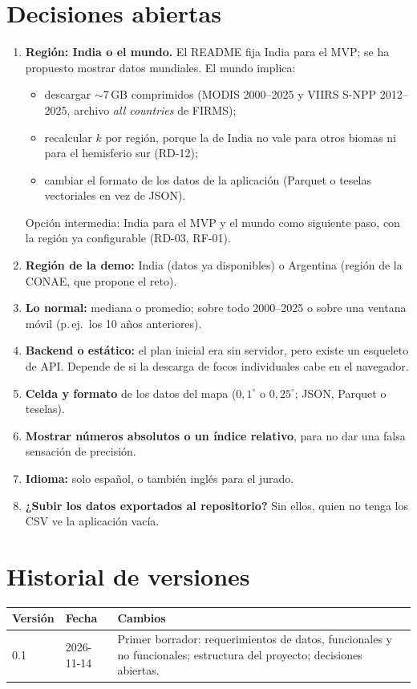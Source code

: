 \section{Decisiones abiertas}\label{sec:decisiones}

\begin{enumerate}
  \item \textbf{Región: India o el mundo.} El README fija India para el MVP; se ha
        propuesto mostrar datos mundiales. El mundo implica:
        \begin{itemize}
          \item descargar $\sim$7\,GB comprimidos (MODIS 2000--2025 y VIIRS S-NPP
                2012--2025, archivo \emph{all countries} de FIRMS);
          \item recalcular $k$ por región, porque la de India no vale para otros biomas
                ni para el hemisferio sur (RD-12);
          \item cambiar el formato de los datos de la aplicación (Parquet o teselas
                vectoriales en vez de JSON).
        \end{itemize}
        Opción intermedia: India para el MVP y el mundo como siguiente paso, con la
        región ya configurable (RD-03, RF-01).
  \item \textbf{Región de la demo:} India (datos ya disponibles) o Argentina (región de
        la CONAE, que propone el reto).
  \item \textbf{Lo normal:} mediana o promedio; sobre todo 2000--2025 o sobre una
        ventana móvil (p.\,ej.\ los 10 años anteriores).
  \item \textbf{Backend o estático:} el plan inicial era sin servidor, pero existe un
        esqueleto de API. Depende de si la descarga de focos individuales cabe en el
        navegador.
  \item \textbf{Celda y formato} de los datos del mapa ($0{,}1^\circ$ o $0{,}25^\circ$;
        JSON, Parquet o teselas).
  \item \textbf{Mostrar números absolutos o un índice relativo}, para no dar una falsa
        sensación de precisión.
  \item \textbf{Idioma:} solo español, o también inglés para el jurado.
  \item \textbf{¿Subir los datos exportados al repositorio?} Sin ellos, quien no tenga
        los CSV ve la aplicación vacía.
\end{enumerate}

\section{Historial de versiones}

\begin{tabularx}{\linewidth}{@{}llX@{}}
\toprule
Versión & Fecha & Cambios \\
\midrule
0.1 & 2026-11-14 & Primer borrador: requerimientos de datos, funcionales y no
                   funcionales; estructura del proyecto; decisiones abiertas. \\
\bottomrule
\end{tabularx}
